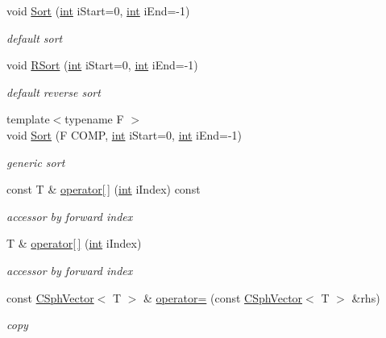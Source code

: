 \begin{DoxyCompactItemize}
void \hyperlink{classCSphVector_a17e7cac4604fa363618027995cace6aa}{Sort} (\hyperlink{sphinxexpr_8cpp_a4a26e8f9cb8b736e0c4cbf4d16de985e}{int} i\-Start=0, \hyperlink{sphinxexpr_8cpp_a4a26e8f9cb8b736e0c4cbf4d16de985e}{int} i\-End=-\/1)
\begin{DoxyCompactList}\small\item\em default sort \end{DoxyCompactList}\item 
void \hyperlink{classCSphVector_aa584a801c3e43a0dfe7016ce5a2c0635}{R\-Sort} (\hyperlink{sphinxexpr_8cpp_a4a26e8f9cb8b736e0c4cbf4d16de985e}{int} i\-Start=0, \hyperlink{sphinxexpr_8cpp_a4a26e8f9cb8b736e0c4cbf4d16de985e}{int} i\-End=-\/1)
\begin{DoxyCompactList}\small\item\em default reverse sort \end{DoxyCompactList}\item 
{\footnotesize template$<$typename F $>$ }\\void \hyperlink{classCSphVector_a1eea2f11f3e7cc45e7f8bb3896794345}{Sort} (F C\-O\-M\-P, \hyperlink{sphinxexpr_8cpp_a4a26e8f9cb8b736e0c4cbf4d16de985e}{int} i\-Start=0, \hyperlink{sphinxexpr_8cpp_a4a26e8f9cb8b736e0c4cbf4d16de985e}{int} i\-End=-\/1)
\begin{DoxyCompactList}\small\item\em generic sort \end{DoxyCompactList}\item 
const T \& \hyperlink{classCSphVector_a1b465521e67a987b853837f5c7787b58}{operator\mbox{[}$\,$\mbox{]}} (\hyperlink{sphinxexpr_8cpp_a4a26e8f9cb8b736e0c4cbf4d16de985e}{int} i\-Index) const 
\begin{DoxyCompactList}\small\item\em accessor by forward index \end{DoxyCompactList}\item 
T \& \hyperlink{classCSphVector_a15671663be877f0e632342a2d362ab61}{operator\mbox{[}$\,$\mbox{]}} (\hyperlink{sphinxexpr_8cpp_a4a26e8f9cb8b736e0c4cbf4d16de985e}{int} i\-Index)
\begin{DoxyCompactList}\small\item\em accessor by forward index \end{DoxyCompactList}\item 
const \hyperlink{classCSphVector}{C\-Sph\-Vector}$<$ T $>$ \& \hyperlink{classCSphVector_a87d8b4eb131a4ccd94759a96fda3118c}{operator=} (const \hyperlink{classCSphVector}{C\-Sph\-Vector}$<$ T $>$ \&rhs)
\begin{DoxyCompactList}\small\item\em copy \end{DoxyCompactList}\item 

\end{DoxyCompactItemize}
